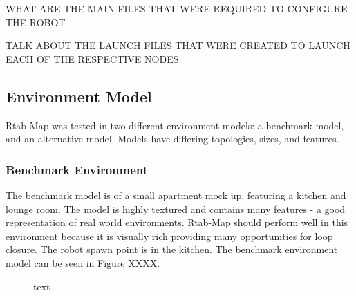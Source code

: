 \documentclass[a4paper]{article}
\begin{document}
\clearpage


WHAT ARE THE MAIN FILES THAT WERE REQUIRED TO CONFIGURE THE ROBOT

TALK ABOUT THE LAUNCH FILES THAT WERE CREATED TO LAUNCH EACH OF THE RESPECTIVE NODES


\subsection{Environment Model}
Rtab-Map was tested in two different environment models: a benchmark model, and an alternative model. Models have differing topologies, sizes, and features. 

\subsubsection{Benchmark Environment}
The benchmark model is of a small apartment mock up, featuring a kitchen and lounge room. The model is highly textured and contains many features - a good representation of real world environments. Rtab-Map should perform well in this environment because it is visually rich providing many opportunities for loop closure. The robot spawn point is in the kitchen. The benchmark environment model can be seen in Figure XXXX.
\begin{figure}[h]
\centering
{}
\caption{text}
\end{figure}
\end{document}
